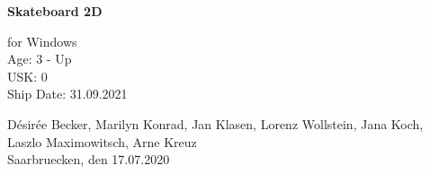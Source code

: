 \begin{titlepage}

\linespread{1.5}

\begin{center}
	 \large
	 \hfill
	 \vfill
	 \Large{\bfseries{Skateboard 2D}}
 		
 	for Windows \\
 	 
	\normalsize
 	\vfill
	 Age: 3 - Up \\
	 USK: 0 \\
	 Ship Date: 31.09.2021
	 
 	\vfill
	\vfill

	Désirée Becker, Marilyn Konrad, Jan Klasen, Lorenz Wollstein, Jana Koch, Laszlo Maximowitsch, Arne Kreuz
	\\ Saarbruecken, den 17.07.2020
\end{center}

\end{titlepage}
